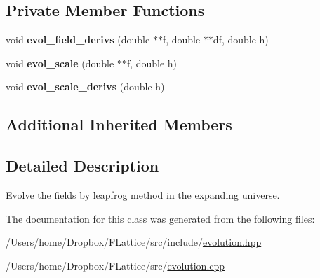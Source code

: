 \subsection*{Private Member Functions}
\begin{DoxyCompactItemize}
\item 
\mbox{\label{class_leap_frog_expansion_a7a155509a648425183fb0e9ac02b4beb}} 
void {\bfseries evol\+\_\+field\+\_\+derivs} (double $\ast$$\ast$f, double $\ast$$\ast$df, double h)
\item 
\mbox{\label{class_leap_frog_expansion_a9b7af3625b0aeea6f03d25f1bd8c6bd9}} 
void {\bfseries evol\+\_\+scale} (double $\ast$$\ast$f, double h)
\item 
\mbox{\label{class_leap_frog_expansion_a2ad530744c6ce8798da0442fbe35a228}} 
void {\bfseries evol\+\_\+scale\+\_\+derivs} (double h)
\end{DoxyCompactItemize}
\subsection*{Additional Inherited Members}


\subsection{Detailed Description}
Evolve the fields by leapfrog method in the expanding universe. 

The documentation for this class was generated from the following files\+:\begin{DoxyCompactItemize}
\item 
/\+Users/home/\+Dropbox/\+F\+Lattice/src/include/\mbox{\hyperlink{evolution_8hpp}{evolution.\+hpp}}\item 
/\+Users/home/\+Dropbox/\+F\+Lattice/src/\mbox{\hyperlink{evolution_8cpp}{evolution.\+cpp}}\end{DoxyCompactItemize}
